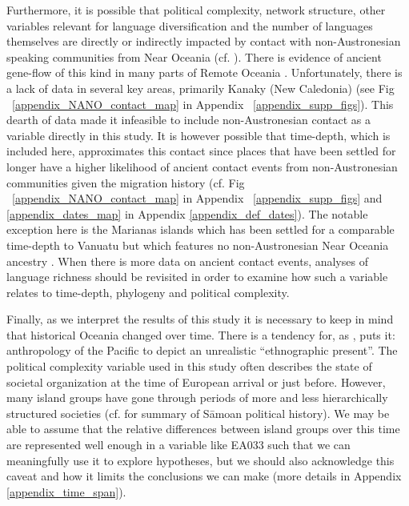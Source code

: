 \documentclass[unnumsec,webpdf,modern,medium]{oup-authoring-template}
\begin{document}
Furthermore, it is possible that political complexity, network structure, other variables relevant for language diversification and the number of languages themselves are directly or indirectly impacted by contact with non-Austronesian speaking communities from Near Oceania (cf. \citet{lynch1981melanesian}). There is evidence of ancient gene-flow of this kind in many parts of Remote Oceania \citep{posth_jena_ancient_dna_vanuatu_2018, lipson_harvad_ancient_dna_vanuatu_2018, liu2022ancient}. Unfortunately, there is a lack of data in several key areas, primarily Kanaky (New Caledonia) (see Fig ~\ref{appendix_NANO_contact_map} in Appendix ~\ref{appendix_supp_figs}). This dearth of data made it infeasible to include non-Austronesian contact as a variable directly in this study. It is however possible that time-depth, which is included here, approximates this contact since places that have been settled for longer have a higher likelihood of ancient contact events from non-Austronesian communities given the migration history (cf. Fig ~\ref{appendix_NANO_contact_map} in Appendix ~\ref{appendix_supp_figs} and \ref{appendix_dates_map} in Appendix \ref{appendix_def_dates}). The notable exception here is the Marianas islands which has been settled for a comparable time-depth to Vanuatu but which features no non-Austronesian Near Oceania ancestry \citep{liu2022ancient}. When there is more data on ancient contact events, analyses of language richness should be revisited in order to examine how such a variable relates to time-depth, phylogeny and political complexity.

Finally, as we interpret the results of this study it is necessary to keep in mind that historical Oceania changed over time. There is a tendency for, as \citet{meleisea1995}, puts it: anthropology of the Pacific to depict an unrealistic ``ethnographic present''. The political complexity variable used in this study often describes the state of societal organization at the time of European arrival or just before. However, many island groups have gone through periods of more and less hierarchically structured societies (cf. \citet[178-183]{skirgaard2020multilevel} for summary of S\={a}moan political history). We may be able to assume that the relative differences between island groups over this time are represented well enough in a variable like EA033 such that we can meaningfully use it to explore hypotheses, but we should also acknowledge this caveat and how it limits the conclusions we can make (more details in Appendix \ref{appendix_time_span}). %
\end{document}
